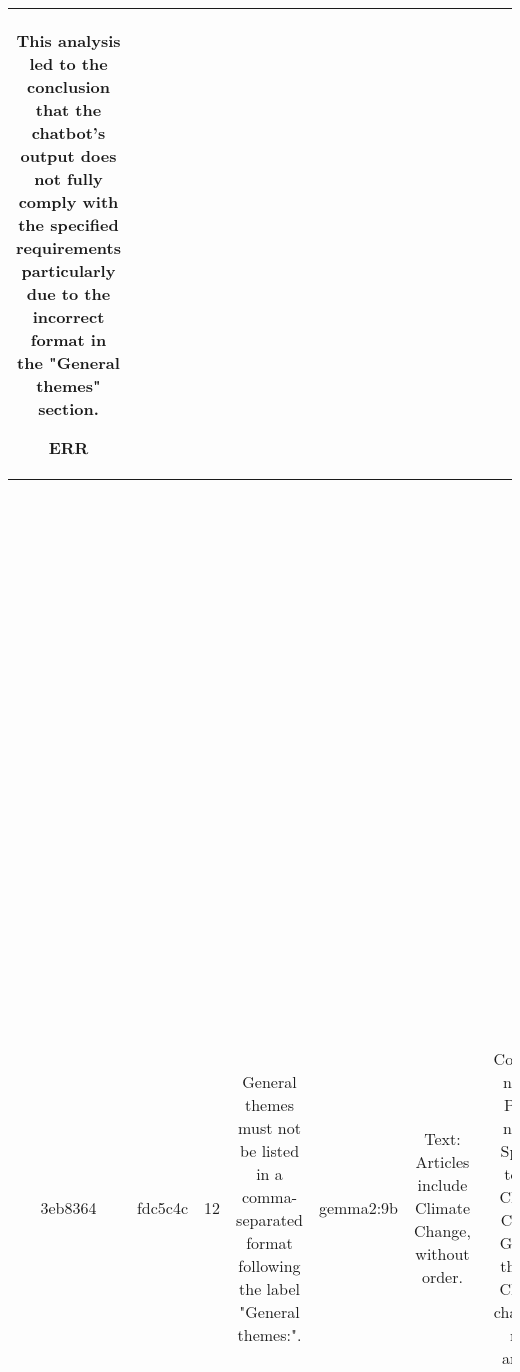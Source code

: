 \begin{table}[h!]
\begin{tabular}{|c|c|c|c|c|c|c|c|c|c|}
This analysis led to the conclusion that the chatbot's output does not fully comply with the specified requirements particularly due to the incorrect format in the "General themes" section.

ERR & \\
\hline
3eb8364 & fdc5c4c & 12 & General themes must not be listed in a comma-separated format following the label "General themes:". & gemma2:9b & Text: Articles include Climate Change, without order. & Company names: 
People names: 
Specific topics: Climate Change
General themes: Climate change in news articles  
 & ok & The output does not comply fully with the chatbot description. According to the description, the output must include a section for "Company names" and "People names," each containing a comma-separated list, even if it is empty. The output provided does include these sections, but the "Company names" and "People names" sections are empty, which is permissible if no data is available. However, there is a redundancy in the themes as "Climate Change" is mentioned under both "Specific topics" and "General themes." Despite the redundancy, the structure of the output complies with the 'Desired format' outlined in the chatbot description.

No violation.
OK & \\
\hline
3eb8364 & fdc5c4c & 12 & General themes must not be listed in a comma-separated format following the label "General themes:". & qwen2.5:3b & Text: Articles include Climate Change, without order. & Based on the provided text:

Company names: 
People names: -||-
Specific topics: Climate Change
General themes: Climate Change

Note that there are no company names or specific people mentioned in this text, so those sections remain empty. The topic "Climate Change" is extracted as both a specific topic and a general overarching theme since the entire provided text mentions it. & err & The chatbot output does not comply with the desired format specified in the description. The description specifies that each category (Company names, People names, Specific topics, General themes) should be followed by a comma-separated list of elements, even if the list is empty, it should reflect that format, likely using a placeholder or similar notation, as demonstrated by the "-||-" used for People names in the output. Furthermore, the Specific topics section seems incorrect based on given instructions, where the ideal format should have a comma-separated list, followed by "-||-", even if empty. 


\end{tabular}
\end{table}
